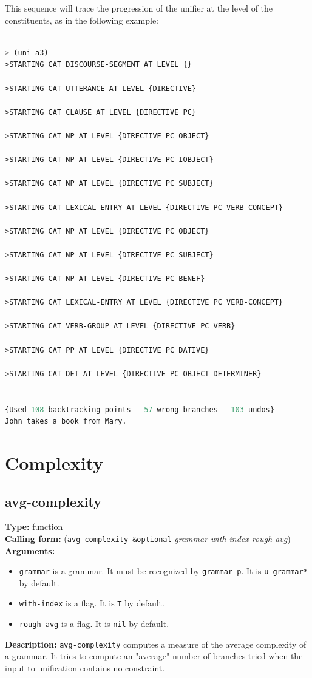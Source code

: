 \documentclass[10pt,a4paper]{report}
\begin{document}
This sequence will trace the progression of the unifier at the level of the
constituents,  as in the following example:

\begin{lstlisting}[language=Lisp]

> (uni a3)
>STARTING CAT DISCOURSE-SEGMENT AT LEVEL {}

>STARTING CAT UTTERANCE AT LEVEL {DIRECTIVE}

>STARTING CAT CLAUSE AT LEVEL {DIRECTIVE PC}

>STARTING CAT NP AT LEVEL {DIRECTIVE PC OBJECT}

>STARTING CAT NP AT LEVEL {DIRECTIVE PC IOBJECT}

>STARTING CAT NP AT LEVEL {DIRECTIVE PC SUBJECT}

>STARTING CAT LEXICAL-ENTRY AT LEVEL {DIRECTIVE PC VERB-CONCEPT}

>STARTING CAT NP AT LEVEL {DIRECTIVE PC OBJECT}

>STARTING CAT NP AT LEVEL {DIRECTIVE PC SUBJECT}

>STARTING CAT NP AT LEVEL {DIRECTIVE PC BENEF}

>STARTING CAT LEXICAL-ENTRY AT LEVEL {DIRECTIVE PC VERB-CONCEPT}

>STARTING CAT VERB-GROUP AT LEVEL {DIRECTIVE PC VERB}

>STARTING CAT PP AT LEVEL {DIRECTIVE PC DATIVE}

>STARTING CAT DET AT LEVEL {DIRECTIVE PC OBJECT DETERMINER}


{Used 108 backtracking points - 57 wrong branches - 103 undos}
John takes a book from Mary.

\end{lstlisting}


\section{Complexity}

\subsection{avg-complexity}
{\bf Type:} function
\\{\bf Calling form:} ({\tt avg-complexity \&optional} {\em grammar
with-index rough-avg})
\\{\bf Arguments:}
\begin{itemize}
\item {\tt grammar} is a grammar. It must be recognized by {\tt grammar-p}.
It is {\tt *u-grammar*} by default.

\item {\tt with-index} is a flag. It is {\tt T} by default.

\item {\tt rough-avg} is a flag. It is {\tt nil} by default.
\end{itemize}
{\bf Description:} {\tt avg-complexity} computes a measure of the
average complexity of a grammar. It tries to compute an "average"
number of branches tried when the input to unification contains
no constraint.
\end{document}
